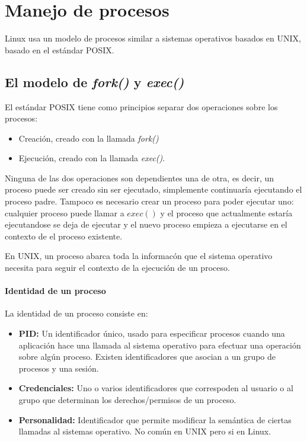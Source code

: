 \documentclass[spanish]{article}
\begin{document}
	

\section{Manejo de procesos}

Linux usa un modelo de procesos similar a sistemas operativos basados en UNIX, basado en el est\'{a}ndar POSIX. 

\subsection{El modelo de \textit{fork()} y \textit{exec()}}

El est\'{a}ndar POSIX tiene como principios separar dos operaciones sobre los procesos: \cite[p. 748, cap.21]{sistosEN}
\begin{itemize}
	\item Creaci\'{o}n, creado con la llamada \textit{fork()}
	\item Ejecuci\'{o}n, creado con la llamada \textit{exec()}.
\end{itemize}

Ninguna de las dos operaciones son dependientes una de otra, es decir, un proceso puede ser creado sin ser ejecutado, simplemente continuar\'{i}a ejecutando el proceso padre. Tampoco es necesario crear un proceso para poder ejecutar uno: cualquier proceso puede llamar a $exec()$ y el proceso que actualmente estar\'{i}a ejecutandose se deja de ejecutar y el nuevo proceso empieza a ejecutarse en el contexto de el proceso existente.

En UNIX, un proceso abarca toda la informac\'{o}n que el sistema operativo necesita para seguir el contexto de la ejecuci\'{o}n de un proceso.

\paragraph{Identidad de un proceso}
La identidad de un proceso consiste en:
\begin{itemize}
	\item \textbf{PID:} Un identificador \'{u}nico, usado para especificar procesos cuando una aplicaci\'{o}n hace una llamada al sistema operativo para efectuar una operaci\'{o}n sobre alg\'{u}n proceso. Existen identificadores que asocian a un grupo de procesos y una sesi\'{o}n.
	\item \textbf{Credenciales: } Uno o varios identificadores que correspoden al usuario o al grupo que determinan los derechos/permisos de un proceso.  
	\item \textbf{Personalidad: } Identificador que permite modificar la sem\'{a}ntica de ciertas llamadas al sistemas operativo. No com\'{u}n en UNIX pero si en Linux.
\end{itemize}
\end{document}
